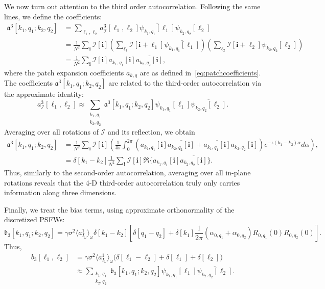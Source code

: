 \documentclass[english,11pt]{article}
\newcommand{\1}{\mathbf{1}}
\newcommand{\II}{\mathcal{I}}
\newcommand{\mb}{\mathbf}
\newcommand{\mk}{\mathfrak}
\newcommand*\Bell{\ensuremath{\boldsymbol\ell}}
\newcommand{\TODO}[1]{{\color{red}{[#1]}}}
\numberwithin{equation}{section}
\theoremstyle{plain}
\theoremstyle{definition}
\theoremstyle{remark}
\theoremstyle{plain}
\theoremstyle{remark}
\theoremstyle{plain}
\theoremstyle{plain}
\begin{document}
We now turn out attention to the third order autocorrelation. Following the same lines, we define the coefficients:
\[\begin{aligned} \mathfrak{a}^3[k_1,q_1;k_2,q_2] &= \sum_{\Bell_1, \Bell_2} a^3_\II[\Bell_1,\Bell_2]\overline{\psi_{k_1,q_1}[\Bell_1]}\psi_{k_2,q_2}[\Bell_2]\\
&= \frac{1}{N^2}\sum_{\mb i}\II[\mb i]\left(\sum_{\Bell_1}\II[\mb i+\Bell_1]\overline{\psi_{k_1,q_1}[\Bell_1]}\right)\left(\sum_{\Bell_2}\II[\mb i+\Bell_2]\psi_{k_2,q_2}[\Bell_2]\right)\\
&= \frac{1}{N^2}\sum_{\mb i}\II[\mb i] a_{k_1,q_1}[\mb i]\overline{a_{k_2,q_2}[\mb i]},
\end{aligned}\]
where the patch expansion coefficients $a_{k,q}$ are as defined in~\eqref{eq:patchcoefficients}.
The coefficients $\mathfrak{a}^3[k_1,q_1;k_2,q_2]$ are related to the third-order autocorrelation via the approximate identity:
\[ a^3_\II[\Bell_1, \Bell_2] \approx \sum_{\substack{k_1,q_1\\ k_2,q_2}}\mathfrak{a}^3[k_1,q_1;k_2,q_2]\psi_{k_1,q_1}[\Bell_1]\overline{\psi_{k_2,q_2}[\Bell_2]}.\]
Averaging over all rotations of $\II$ and its reflection, we obtain
\begin{align} \label{eq:third_order_ac_pswf}
\mathfrak{a}^3[k_1,q_1;k_2,q_2] &= \frac{1}{N^2}\sum_{\mb i}\II[\mb i]\left(\frac{1}{4\pi}\int_0^{2\pi}\left(a_{k_1,q_1}[\mb i]\overline{a_{k_2,q_2}[\mb i]} + \overline{a_{k_1,q_1}[\mb i]}a_{k_2,q_2}[\mb i]\right)e^{-\iota(k_1-k_2)\alpha}d\alpha\right), \nonumber\\
&= \delta[k_1 - k_2]\frac{1}{N^2}\sum_{\mb i}\II[\mb i]\Re\{a_{k_1,q_1}[\mb i]\overline{a_{k_2,q_2}[\mb i]}\}. 
\end{align}
Thus, similarly to the second-order autocorrelation, averaging over all in-plane rotations reveals that the 4-D third-order autocorrelation truly only carries information along three dimensions.

Finally, we treat the bias terms, using approximate orthonormality \TODO{!} of the discretized PSFWs:
\[ \mk b_3[k_1,q_1; k_2,q_2] = \gamma\sigma^2\langle a^1_{I_{\omega}} \rangle_\omega \delta[k_1 - k_2]\left[\delta[q_1-q_2] + \delta[k_1]\frac{1}{2\pi}(\alpha_{0,q_1} + \alpha_{0,q_2})R_{0,q_1}(0)R_{0,q_2}(0)\right]. \]
Thus,
\begin{align*}
	b_3[\Bell_1, \Bell_2] & = \gamma\sigma^2\langle a^1_{I_{\omega}}\rangle_{\omega}\Big(\delta[\Bell_1 - \Bell_2] +
	\delta[\Bell_1] + \delta[\Bell_2]\Big) \\
	& \approx \sum_{\substack{k_1, q_1\\ k_2, q_2}} \mk 
	b_3[k_1,q_1; k_2, q_2]\psi_{k_1,q_1}[\Bell_1]\overline{\psi_{k_2,q_2}[\Bell_2]}.
\end{align*}
\end{document}
